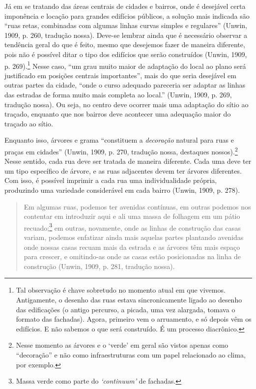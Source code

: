 \documentclass[12pt, a4paper]{book} %
\begin{document}
        Já em se tratando das áreas centrais de cidades e bairros, onde é desejável certa imponência e locação para grandes edifícios públicos, a solução mais indicada são ``ruas retas, combinadas com algumas linhas curvas simples e regulares'' (Unwin, 1909, p. 260, tradução nossa). Deve-se lembrar ainda que é necessário observar a tendência geral do que é feito, mesmo que desejemos fazer de maneira diferente, pois não é possível ditar o tipo dos edifícios que serão construídos (Unwin, 1909, p. 269).\footnote[84]{Tal observação é chave sobretudo no momento atual em que vivemos. Antigamente, o desenho das ruas estava sincronicamente ligado ao desenho das edificações (o antigo percurso, a picada, uma vez alargada, tomava o formato das fachadas). Agora, primeiro vem o arruamento, e só depois vêm os edifícios. E não sabemos o que será construído. É um processo diacrônico.} Nesse caso, ``um grau muito maior de adaptação do local ao plano será justificado em posições centrais importantes'', mais do que seria desejável em outras partes da cidade, ``onde o curso adequado pareceria ser adaptar as linhas das estradas de forma muito mais completa ao local.'' (Unwin, 1909, p. 269, tradução nossa). Ou seja, no centro deve ocorrer mais uma adaptação do sítio ao traçado, enquanto que nos bairros deve acontecer uma adequação maior do traçado ao sítio.

        Enquanto isso, árvores e grama ``constituem a \textit{decoração} natural para ruas e praças em cidades'' (Unwin, 1909, p. 270, tradução nossa, destaques nossos).\footnote[87]{Nesse momento as árvores e o `verde' em geral são vistos apenas como ``decoração'' e não como infraestruturas com um papel relacionado ao clima, por exemplo.} Nesse sentido, cada rua deve ser tratada de maneira diferente. Cada uma deve ter um tipo específico de árvore, e as ruas adjacentes devem ter árvores diferentes. Com isso, é possível imprimir a cada rua uma individualidade própria, produzindo uma variedade considerável em cada bairro (Unwin, 1909, p. 278).

        \begin{quotation}
            Em algumas ruas, podemos ter avenidas contínuas, em outras podemos nos contentar em introduzir aqui e ali uma massa de folhagem em um pátio recuado;\footnote[89]{Massa verde como parte do \textit{`continuum'} de fachadas.} em outras, novamente, onde as linhas de construção das casas variam, podemos enfatizar ainda mais aquelas partes plantando avenidas onde nossas casas recuam mais da estrada e as árvores têm mais espaço para crescer, e omitindo-as onde as casas estão posicionadas na linha de construção (Unwin, 1909, p. 281, tradução nossa).
        \end{quotation}
\end{document}
